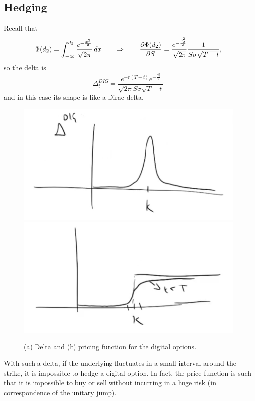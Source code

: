 \subsection{Hedging}
Recall that
\begin{equation*}
    \Phi(d_2) = \int^{d_2}_{-\infty} \dfrac{e^{-\frac{x^2}{2}}}{\sqrt{2\pi}}\,dx \qquad\Rightarrow\qquad \pdv{\Phi(d_2)}{S} = \dfrac{e^{-\frac{d_2^2}{2}}}{\sqrt{2\pi}}\dfrac{1}{S\sigma\sqrt{T-t}},
\end{equation*}
so the delta is
\begin{equation}
    \Delta^{DIG}_t = \dfrac{e^{-r(T-t)}e^{-\frac{d_2^2}{2}}}{\sqrt{2\pi}S\sigma\sqrt{T-t}}
\end{equation}
and in this case its shape is like a Dirac delta.
\begin{figure}[htp]
    \centering
    \includegraphics[scale=0.3]{fig/tmp/fig24.png}
    \includegraphics[scale=0.3]{fig/tmp/fig25.png}
    \caption{(a) Delta and (b) pricing function for the digital options.}
    \label{fig:digdelta}
\end{figure}
\newline With such a delta, if the underlying fluctuates in a small interval around the strike, it is impossible to hedge a digital option. In fact, the price function is such that it is impossible to buy or sell without incurring in a huge risk (in correspondence of the unitary jump). \\
